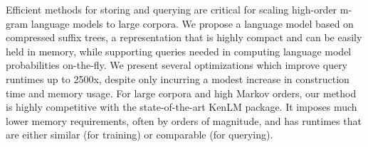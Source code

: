 Efficient methods for storing and querying are critical for scaling high-order m-gram language models to large corpora. We propose a language model based on compressed suffix trees, a representation that is highly compact and can be easily held in memory, while supporting queries needed in computing language model probabilities on-the-fly. We present several optimizations which improve query runtimes up to 2500x, despite only incurring a modest increase in construction time and memory usage. For large corpora and high Markov orders, our method is highly competitive with the state-of-the-art KenLM package. It imposes much lower memory requirements, often by orders of magnitude, and has runtimes that are either similar (for training) or comparable (for querying).
